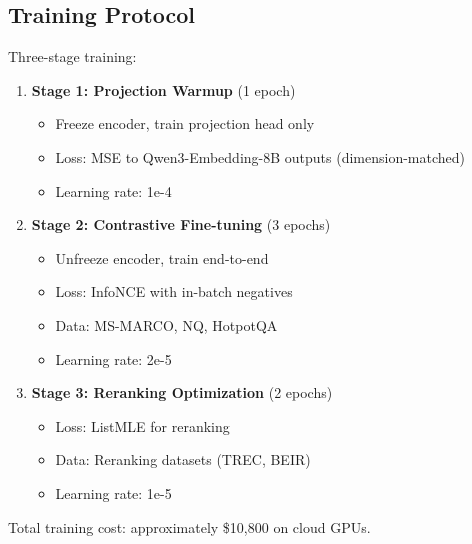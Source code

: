 \subsection{Training Protocol}

Three-stage training:

\begin{enumerate}
    \item \textbf{Stage 1: Projection Warmup} (1 epoch)
    \begin{itemize}
        \item Freeze encoder, train projection head only
        \item Loss: MSE to Qwen3-Embedding-8B outputs (dimension-matched)
        \item Learning rate: 1e-4
    \end{itemize}

    \item \textbf{Stage 2: Contrastive Fine-tuning} (3 epochs)
    \begin{itemize}
        \item Unfreeze encoder, train end-to-end
        \item Loss: InfoNCE with in-batch negatives
        \item Data: MS-MARCO, NQ, HotpotQA
        \item Learning rate: 2e-5
    \end{itemize}

    \item \textbf{Stage 3: Reranking Optimization} (2 epochs)
    \begin{itemize}
        \item Loss: ListMLE for reranking
        \item Data: Reranking datasets (TREC, BEIR)
        \item Learning rate: 1e-5
    \end{itemize}
\end{enumerate}

Total training cost: approximately \$10,800 on cloud GPUs.

